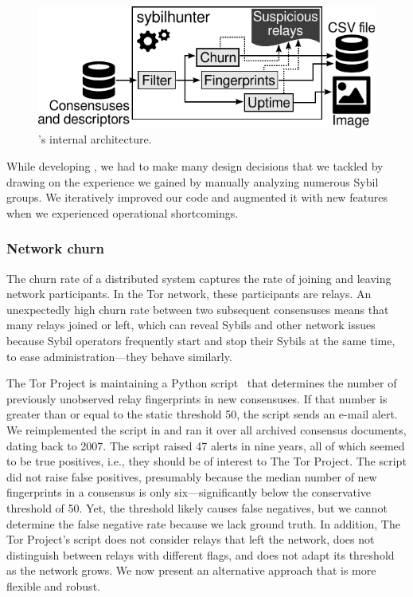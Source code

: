 \begin{figure}[t]
	\centering
	\includegraphics[width=0.9\linewidth]{diagrams/internal-architecture.pdf}
	\caption{\Sys's internal architecture.}
	\label{fig:shr-internal}
\end{figure}

While developing \sys, we had to make many design decisions that we
tackled by drawing on the experience we gained by manually analyzing numerous
Sybil groups.  We iteratively improved our code and augmented it with new
features when we experienced operational shortcomings.

\subsubsection{Network churn}
\label{sec:churn-time-series}
The churn rate of a distributed system captures the rate of joining and leaving
network participants.  In the Tor network, these participants are relays.  An
unexpectedly high churn rate between two subsequent consensuses means that many
relays joined or left, which can reveal Sybils and other network issues because
Sybil operators frequently start and stop their Sybils at the same time, to ease
administration---they behave similarly.

The Tor Project is maintaining a Python script~\cite{doctor} that determines the
number of previously unobserved relay fingerprints in new consensuses.  If that
number is greater than or equal to the static threshold 50, the script sends an
e-mail alert.  We reimplemented the script in \sys and ran it over all archived
consensus documents, dating back to 2007.  The script raised 47 alerts in nine
years, all of which seemed to be true positives, i.e., they should be of
interest to The Tor Project.  The script did not raise false positives,
presumably because the median number of new fingerprints in a consensus is only
six---significantly below the conservative threshold of 50.  Yet, the threshold
likely causes false negatives, but we cannot determine the false negative rate
because we lack ground truth.  In addition, The Tor Project's script does not
consider relays that left the network, does not distinguish between relays with
different flags, and does not adapt its threshold as the network grows.  We now
present an alternative approach that is more flexible and robust.

